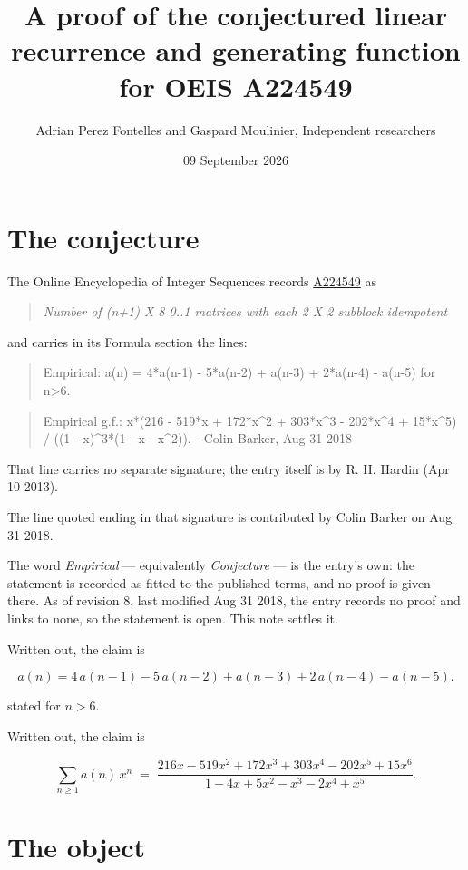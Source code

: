 \documentclass[11pt]{article}
\title{A proof of the conjectured linear recurrence and generating function for OEIS A224549}
\author{Adrian Perez Fontelles and Gaspard Moulinier, Independent researchers}
\date{09 September 2026}
\theoremstyle{definition}
\begin{document}
\maketitle
\section{The conjecture}

The Online Encyclopedia of Integer Sequences records \href{https://oeis.org/A224549}{A224549} as

\begin{quote}\itshape Number of (n+1) X 8 0..1 matrices with each 2 X 2 subblock idempotent\end{quote}

and carries in its Formula section the lines:

\begin{quote}\ttfamily Empirical: a(n) = 4*a(n-1) - 5*a(n-2) + a(n-3) + 2*a(n-4) - a(n-5) for n>6.\end{quote}

\begin{quote}\ttfamily Empirical g.f.: x*(216 - 519*x + 172*x\textasciicircum{}2 + 303*x\textasciicircum{}3 - 202*x\textasciicircum{}4 + 15*x\textasciicircum{}5) / ((1 - x)\textasciicircum{}3*(1 - x - x\textasciicircum{}2)). - Colin Barker, Aug 31 2018\end{quote}

That line carries no separate signature; the entry itself is by R. H. Hardin (Apr 10 2013).

The line quoted ending in that signature is contributed by Colin Barker on Aug 31 2018.

The word {\itshape Empirical} --- equivalently {\itshape Conjecture} --- is the entry's own: the statement is recorded as fitted to the published terms, and no proof is given there. As of revision 8, last modified Aug 31 2018, the entry records no proof and links to none, so the statement is open. This note settles it.

Written out, the claim is

\[a(n) = 4\,a(n-1) - 5\,a(n-2) + a(n-3) + 2\,a(n-4) - a(n-5).\]

stated for $n > 6$.

Written out, the claim is

\[\sum_{n \ge 1} a(n)\,x^n \;=\; \frac{216x - 519x^{2} + 172x^{3} + 303x^{4} - 202x^{5} + 15x^{6}}{1 - 4x + 5x^{2} - x^{3} - 2x^{4} + x^{5}}.\]

\section{The object}
\end{document}
